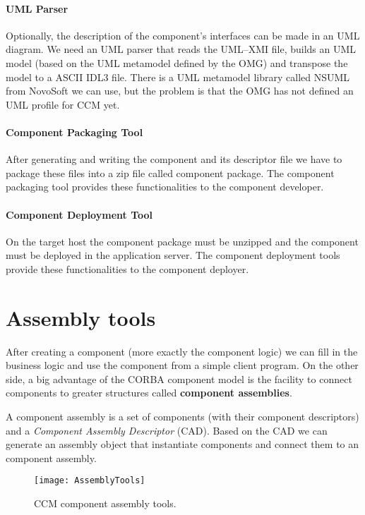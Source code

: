 \paragraph{UML Parser}

Optionally, the description of the component's interfaces can be made in an UML
diagram. We need an UML parser that reads the UML--XMI file, builds an UML model
(based on the UML metamodel defined by the OMG) and transpose the model to a
ASCII IDL3 file. There is a UML metamodel library called NSUML from NovoSoft we
can use, but the problem is that the OMG has not defined an UML profile for CCM
yet.

\paragraph{Component Packaging Tool}

After generating and writing the component and its descriptor file we have to
package these files into a zip file called component package. The component
packaging tool provides these functionalities to the component developer.

\paragraph{Component Deployment Tool}

On the target host the component package must be unzipped and the component must
be deployed in the application server. The component deployment tools provide
these functionalities to the component deployer.

\section{Assembly tools}

After creating a component (more exactly the component logic) we can fill in the
business logic and use the component from a simple client program. On the other
side, a big advantage of the CORBA component model is the facility to connect
components to greater structures called {\bf component assemblies}.

A component assembly is a set of components (with their component descriptors)
and a {\it Component Assembly Descriptor} (CAD). Based on the CAD we can
generate an assembly object that instantiate components and connect them to an
component assembly.

\begin{figure}
\texttt{[image: AssemblyTools]}
\caption{CCM component assembly tools.}
\label{fig:intro-AssemblyTools}
\end{figure}

